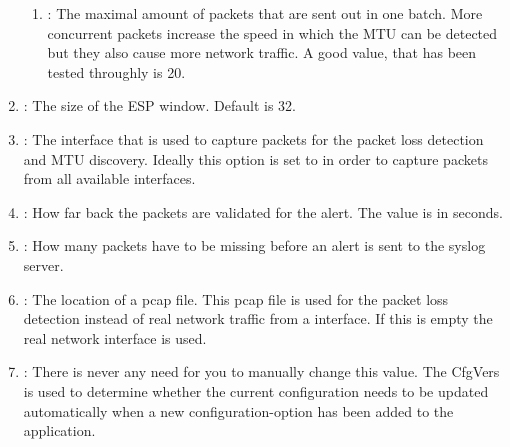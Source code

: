 \begin{enumerate}
\begin{enumerate}
	  \item {}: The maximal amount of packets that are sent out in one batch. More concurrent packets increase the speed in which the \acs{MTU} can be detected but they also cause more network traffic. A good value, that has been tested throughly is 20.
  \end{enumerate}
  \item {}: The size of the ESP window. Default is 32.
  \item {}: The interface that is used to capture packets for the packet loss detection and \acs{MTU} discovery. Ideally this option is set to  in order to capture packets from all available interfaces. 
  \item {}:  How far back the packets are validated for the alert. The value is in seconds.
  \item {}: How many packets have to be missing before an alert is sent to the syslog server.
  \item {}: The location of a pcap file. This pcap file is used for the packet loss detection instead of real network traffic from a interface. If this is empty the real network interface is used.
  \item {}: There is never any need for you to manually change this value. The CfgVers is used to determine whether the current configuration needs to be updated automatically when a new configuration-option has been added to the application.
\end{enumerate}

